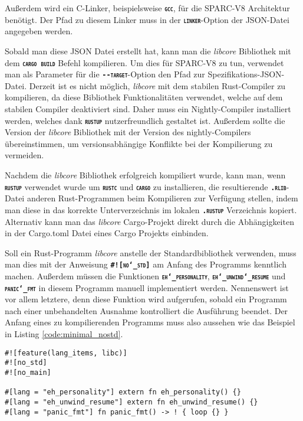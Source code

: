 Außerdem wird ein C-Linker, beispielsweise \texttt{\textsc{\textbf{gcc}}},
für die SPARC-V8 Architektur benötigt. Der Pfad zu diesem Linker
muss in der \texttt{\textsc{\textbf{linker}}}-Option der JSON-Datei angegeben werden.

Sobald man diese JSON Datei erstellt hat, kann man die \textit{libcore} Bibliothek mit dem
\texttt{\textsc{\textbf{cargo build}}} Befehl kompilieren.
Um dies für SPARC-V8 zu tun, verwendet man als Parameter für die \texttt{\textsc{\textbf{-{}-target}}}-Option
den Pfad zur Spezifikations-JSON-Datei.
Derzeit ist es nicht möglich, \textit{libcore} mit dem stabilen Rust-Compiler zu kompilieren,
da diese Bibliothek Funktionalitäten verwendet, welche auf dem stabilen Compiler deaktiviert sind.
Daher muss ein Nightly-Compiler installiert werden, welches
dank \texttt{\textsc{\textbf{rustup}}} nutzerfreundlich gestaltet ist.
Außerdem sollte die Version der \textit{libcore} Bibliothek
mit der Version des nightly-Compilers übereinstimmen,
um versionsabhängige Konflikte bei der Kompilierung zu vermeiden.

Nachdem die \textit{libcore} Bibliothek erfolgreich kompiliert wurde, kann man,
wenn \texttt{\textsc{\textbf{rustup}}} verwendet wurde um \texttt{\textsc{\textbf{rustc}}} und
\texttt{\textsc{\textbf{cargo}}} zu installieren, 
die resultierende \texttt{\textsc{\textbf{.rlib}}}-Datei anderen Rust-Programmen
beim Kompilieren zur Verfügung stellen,
indem man diese in das korrekte Unterverzeichnis im lokalen \texttt{\textsc{\textbf{.rustup}}} Verzeichnis kopiert.
Alternativ kann man das \textit{libcore} Cargo-Projekt direkt durch die Abhängigkeiten in der Cargo.toml Datei
eines Cargo Projekts einbinden.

Soll ein Rust-Programm \textit{libcore} anstelle der Standardbibliothek verwenden, muss man dies
mit der Anweisung \texttt{\textsc{\textbf{\#![no\char`_std]}}}
am Anfang des Programms kenntlich machen.
Außerdem müssen die Funktionen \texttt{\textsc{\textbf{eh\char`_personality}}},
\texttt{\textsc{\textbf{eh\char`_unwind\char`_resume}}} und
\texttt{\textsc{\textbf{panic\char`_fmt}}} in diesem Programm manuell implementiert werden.
Nennenswert ist vor allem letztere, denn diese Funktion
wird aufgerufen, sobald ein Programm nach einer unbehandelten Ausnahme kontrolliert die Ausführung beendet.
Der Anfang eines zu kompilierenden Programms muss also aussehen wie das Beispiel in Listing \ref{code:minimal_nostd}.

\begin{lstlisting}[float,caption={
Der Beginn eines Rust-Programms, welches nicht die Standardbibliothek verwendet.
},label=code:minimal_nostd]
#![feature(lang_items, libc)]
#![no_std]
#![no_main]

#[lang = "eh_personality"] extern fn eh_personality() {}
#[lang = "eh_unwind_resume"] extern fn eh_unwind_resume() {}
#[lang = "panic_fmt"] fn panic_fmt() -> ! { loop {} }
\end{lstlisting}

